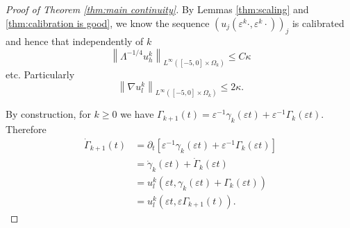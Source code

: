 \documentclass[11pt]{amsart}
\theoremstyle{remark}
\theoremstyle{definition}
\newcommand{\eps}{\varepsilon}
\newcommand{\norm}[1]{\left\lVert#1\right\rVert}
\newcommand{\bracket}[1]{\left[ #1 \right]}
\newcommand{\del}{\partial}
\newcommand{\grad}{\nabla}
\newcommand{\n}{^{-1}}
\newcommand{\ulow}{u_l}
\newcommand{\uhigh}{u_h}
\newcommand{\ulowth}[1]{\ulow^{#1}}
\newcommand{\uhighth}[1]{\uhigh^{#1}}
\begin{document}
\begin{proof}[Proof of Theorem \ref{thm:main continuity}]
By Lemmas \ref{thm:scaling} and \ref{thm:calibration is good}, we know the sequence $(u_j(\eps^k \cdot, \eps^k \cdot))_j$ is calibrated and hence that independently of $k$
\[ \norm{\Lambda^{-1/4} \uhighth{k}}_{L^\infty([-5,0]\times \Omega_k)} \leq C \kappa \]
etc.  
Particularly
\[ \norm{\grad \ulowth{k}}_{L^\infty([-5,0]\times \Omega_k)} \leq 2 \kappa. \]


By construction, for $k \geq 0$ we have $\Gamma_{k+1}(t) = \eps\n \gamma_k(\eps t) + \eps\n \Gamma_k(\eps t)$.  Therefore
\begin{align*} 
\dot{\Gamma}_{k+1}(t) &= \del_t \bracket{\eps\n \gamma_k(\eps t) + \eps\n \Gamma_k(\eps t)}
\\ &= \dot{\gamma}_k(\eps t) + \dot{\Gamma}_k(\eps t)
\\ &= \ulowth{k}(\eps t, \gamma_k(\eps t) + \Gamma_k(\eps t))
\\ &= \ulowth{k}(\eps t, \eps \Gamma_{k+1}(t)).  
\end{align*}

%


\end{proof}
\end{document}
